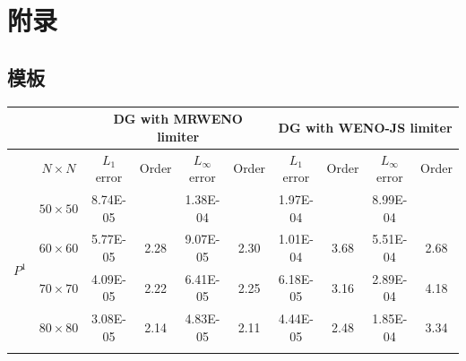 \documentclass{book}
\begin{document}
\chapter{附录}
\section{模板}
\begin{table}[ht]
    \small
    \centering
    \begin{tabular}{|c|c|cccc|cccc|}
        \hline
                               &                 & \multicolumn{4}{c|}{DG   with MRWENO limiter} & \multicolumn{4}{c|}{DG   with WENO-JS limiter}                                                                                                                                                                 \\ \hline
                               & $N\times N$     & \multicolumn{1}{c|}{$L_1$ error}              & \multicolumn{1}{c|}{Order}                     & \multicolumn{1}{c|}{$L_\infty$ error} & Order & \multicolumn{1}{c|}{$L_1$ error} & \multicolumn{1}{c|}{Order} & \multicolumn{1}{c|}{$L_\infty$ error} & Order \\ \hline
        \multirow{6}{*}{$P^1$} & $50\times 50$   & \multicolumn{1}{c|}{8.74E-05}                 & \multicolumn{1}{c|}{}                          & \multicolumn{1}{c|}{1.38E-04}         &       & \multicolumn{1}{c|}{1.97E-04}    & \multicolumn{1}{c|}{}      & \multicolumn{1}{c|}{8.99E-04}         &       \\ \cline{2-10}
                               & $60\times 60$   & \multicolumn{1}{c|}{5.77E-05}                 & \multicolumn{1}{c|}{2.28}                      & \multicolumn{1}{c|}{9.07E-05}         & 2.30  & \multicolumn{1}{c|}{1.01E-04}    & \multicolumn{1}{c|}{3.68}  & \multicolumn{1}{c|}{5.51E-04}         & 2.68  \\ \cline{2-10}
                               & $70\times 70$   & \multicolumn{1}{c|}{4.09E-05}                 & \multicolumn{1}{c|}{2.22}                      & \multicolumn{1}{c|}{6.41E-05}         & 2.25  & \multicolumn{1}{c|}{6.18E-05}    & \multicolumn{1}{c|}{3.16}  & \multicolumn{1}{c|}{2.89E-04}         & 4.18  \\ \cline{2-10}
                               & $80\times 80$   & \multicolumn{1}{c|}{3.08E-05}                 & \multicolumn{1}{c|}{2.14}                      & \multicolumn{1}{c|}{4.83E-05}         & 2.11  & \multicolumn{1}{c|}{4.44E-05}    & \multicolumn{1}{c|}{2.48}  & \multicolumn{1}{c|}{1.85E-04}         & 3.34  \\ \cline{2-10}

\end{tabular}
\end{table}
\end{document}
